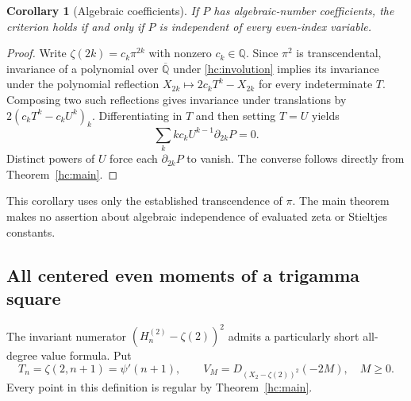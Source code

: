 \documentclass[11pt]{article}
\numberwithin{equation}{section}
\newtheorem{corollary}[theorem]{Corollary}
\theoremstyle{definition}
\theoremstyle{remark}
\begin{document}
\begin{corollary}[Algebraic coefficients]
\label{hc:algebraic}
If $P$ has algebraic-number coefficients, the criterion holds if
and only if $P$ is independent of every even-index variable.
\end{corollary}
\begin{proof}
Write $\zeta(2k)=c_k\pi^{2k}$ with nonzero $c_k\in\mathbb Q$.
Since $\pi^2$ is transcendental, invariance of a polynomial over
$\overline{\mathbb Q}$ under \eqref{hc:involution} implies its
invariance under the polynomial reflection
$X_{2k}\mapsto2c_kT^k-X_{2k}$ for every indeterminate $T$.
Composing two such reflections gives invariance under translations
by $2(c_kT^k-c_kU^k)_k$. Differentiating in $T$ and then setting
$T=U$ yields
\[
             \sum_k k c_k U^{k-1}\partial_{2k}P=0.
\]
Distinct powers of $U$ force each $\partial_{2k}P$ to vanish.
The converse follows directly from Theorem~\ref{hc:main}.
\end{proof}

This corollary uses only the established transcendence of $\pi$.
The main theorem makes no assertion about algebraic independence
of evaluated zeta or Stieltjes constants.

\subsection{All centered even moments of a trigamma square}

The invariant numerator $(H_n^{(2)}-\zeta(2))^2$ admits a particularly
short all-degree value formula. Put
\[
 T_n=\zeta(2,n+1)=\psi'(n+1),\qquad
 V_M=D_{(X_2-\zeta(2))^2}(-2M),\quad M\ge0.
\]
Every point in this definition is regular by Theorem~\ref{hc:main}.
\end{document}

